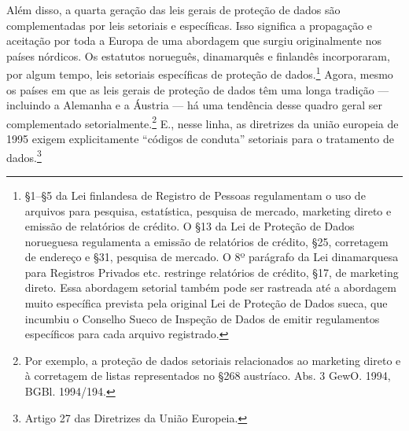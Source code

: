 Além disso, a quarta geração das leis gerais de proteção de dados são
complementadas por leis setoriais e específicas. Isso significa a
propagação e aceitação por toda a Europa de uma abordagem que surgiu
originalmente nos países nórdicos. Os estatutos norueguês, dinamarquês e
finlandês incorporaram, por algum tempo, leis setoriais específicas de
proteção de dados.\footnote{§1--§5 da Lei finlandesa de Registro de
  Pessoas regulamentam o uso de arquivos para pesquisa, estatística,
  pesquisa de mercado, marketing direto e emissão de relatórios de
  crédito. O §13 da Lei de Proteção de Dados norueguesa regulamenta a
  emissão de relatórios de crédito, §25, corretagem de endereço e §31,
  pesquisa de mercado. O 8º parágrafo da Lei dinamarquesa para Registros
  Privados etc. restringe relatórios de crédito, §17, de marketing
  direto. Essa abordagem setorial também pode ser rastreada até a
  abordagem muito específica prevista pela original Lei de Proteção de
  Dados sueca, que incumbiu o Conselho Sueco de Inspeção de Dados de
  emitir regulamentos específicos para cada arquivo registrado.} Agora,
mesmo os países em que as leis gerais de proteção de dados têm uma longa
tradição --- incluindo a Alemanha e a Áustria --- há uma tendência desse
quadro geral ser complementado setorialmente.\footnote{Por exemplo, a
  proteção de dados setoriais relacionados ao marketing direto e à
  corretagem de listas representados no §268 austríaco. Abs. 3 GewO.
  1994, BGBl. 1994/194.} E., nesse linha, as diretrizes da união
europeia de 1995 exigem explicitamente ``códigos de conduta'' setoriais
para o tratamento de dados.\footnote{Artigo 27 das Diretrizes da União
  Europeia.}

